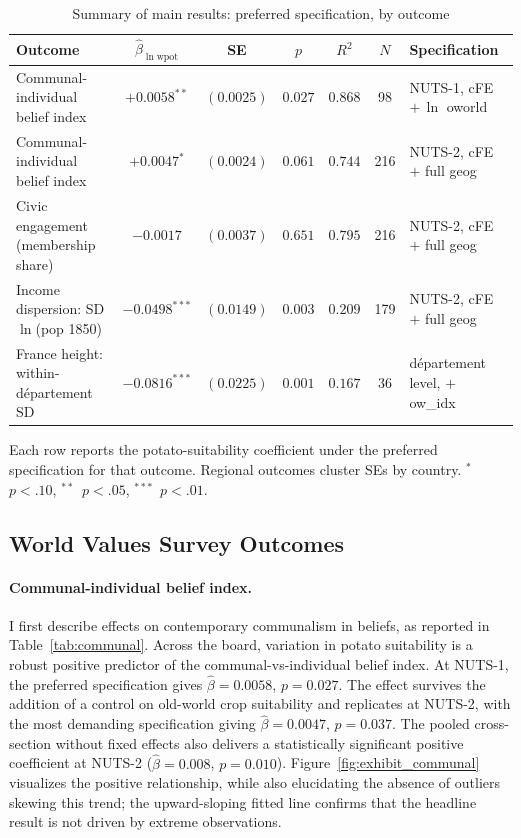 \documentclass[11pt]{article}
\begin{document}
\begin{table}[H]\centering
\caption{Summary of main results: preferred specification, by outcome}
\label{tab:summary}
\small
\begin{threeparttable}
\begin{tabular}{lcccccl}
\toprule
Outcome & $\hat\beta_{\ln\mathrm{wpot}}$ & SE & $p$ & $R^2$ & $N$ & Specification \\
\midrule
Communal-individual belief index           & $+0.0058^{**}$  & $(0.0025)$ & $0.027$ & $0.868$ & 98     & NUTS-1, cFE $+\,\ln$ oworld \\
Communal-individual belief index           & $+0.0047^{*}$   & $(0.0024)$ & $0.061$ & $0.744$ & 216    & NUTS-2, cFE $+$ full geog \\
Civic engagement (membership share)         & $-0.0017$       & $(0.0037)$ & $0.651$ & $0.795$ & 216    & NUTS-2, cFE $+$ full geog \\
Income dispersion: SD $\ln$(pop 1850)       & $-0.0498^{***}$ & $(0.0149)$ & $0.003$ & $0.209$ & 179    & NUTS-2, cFE $+$ full geog \\
France height: within-département SD        & $-0.0816^{***}$ & $(0.0225)$ & $0.001$ & $0.167$ & 36     & département level, $+$ ow\_idx \\
\bottomrule
\end{tabular}
\begin{tablenotes}\footnotesize
\item Each row reports the potato-suitability coefficient under the preferred specification for that outcome. Regional outcomes cluster SEs by country. $^{*}$~$p<.10$, $^{**}$~$p<.05$, $^{***}$~$p<.01$.
\end{tablenotes}
\end{threeparttable}
\end{table}

\FloatBarrier

\subsection{World Values Survey Outcomes}\label{sec:wvs}
\paragraph{Communal-individual belief index.} I first describe effects on contemporary communalism in beliefs, as reported in Table~\ref{tab:communal}. Across the board, variation in potato suitability is a robust positive predictor of the communal-vs-individual belief index. At NUTS-1, the preferred specification gives $\hat\beta = 0.0058$, $p = 0.027$. The effect survives the addition of a control on old-world crop suitability and replicates at NUTS-2, with the most demanding specification giving $\hat\beta = 0.0047$, $p = 0.037$. The pooled cross-section without fixed effects also delivers a statistically significant positive coefficient at NUTS-2 ($\hat\beta = 0.008$, $p = 0.010$). Figure~\ref{fig:exhibit_communal} visualizes the positive relationship, while also elucidating the absence of outliers skewing this trend; the upward-sloping fitted line confirms that the headline result is not driven by extreme observations.
\end{document}
